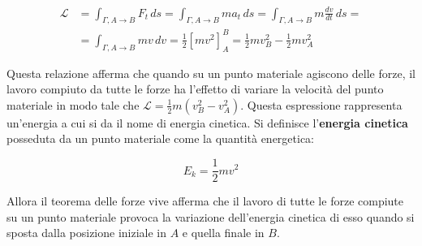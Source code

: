 \begin{equation*}
	\begin{aligned}
		\mathcal{L} &= \int_{\Gamma, A\to B} F_t\,ds=\int_{\Gamma, A\to B} ma_t\,ds=\int_{\Gamma, A\to B} m\frac{dv}{dt}\,ds= \\
		&= \int_{\Gamma, A\to B} mv\,dv=\frac{1}{2}[ mv^2 ]^B_A=\frac{1}{2}mv^2_B-\frac{1}{2}mv^2_A
	\end{aligned}
\end{equation*}

Questa relazione afferma che quando su un punto materiale agiscono delle forze, il lavoro compiuto da tutte le forze ha l'effetto di variare la velocità del punto materiale in modo tale che $\mathcal{L} = \frac{1}{2}m(v^2_B-v^2_A)$.
Questa espressione rappresenta un'energia a cui si da il nome di energia cinetica. Si definisce l'\textbf{energia cinetica} posseduta da un punto materiale come la quantità energetica:

\[
	\boxed{E_k=\frac{1}{2}mv^2}
\]

Allora il teorema delle forze vive afferma che il lavoro di tutte le forze compiute su un punto materiale provoca la variazione dell'energia cinetica di esso quando si sposta dalla posizione iniziale in $A$ e quella finale in $B$. 

